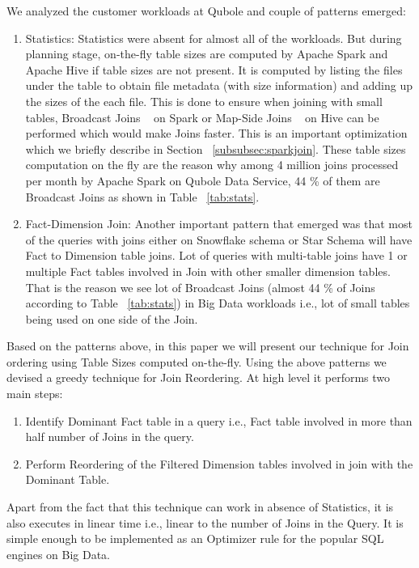 \documentclass[conference]{IEEEtran}
\begin{document}
We analyzed the customer workloads at Qubole and couple of patterns emerged:
\begin{enumerate}
\item Statistics: Statistics were absent for almost all of the workloads. But  during planning stage, on-the-fly table sizes are computed by Apache Spark and Apache Hive if table sizes are not present. It is computed by listing the files under the table to obtain file metadata (with size information) and adding up the sizes of the each file. This is done to ensure when joining with small tables, Broadcast Joins ~\cite{b13} on Spark or Map-Side Joins ~\cite{b10} on Hive can be performed which would make Joins faster. This is an important optimization which we briefly describe in Section ~\ref{subsubsec:sparkjoin}. These table sizes computation on the fly are the reason why among 4 million joins processed per month by Apache Spark on Qubole Data Service, 44 \% of them are Broadcast Joins as shown in Table ~\ref{tab:stats}.
\item Fact-Dimension Join: Another important pattern that emerged was that most of the queries with joins either on Snowflake schema or Star Schema will have Fact to Dimension table joins. Lot of queries with multi-table joins have 1 or multiple Fact tables involved in Join with other smaller dimension tables. That is the reason we see lot of Broadcast Joins (almost 44 \% of Joins according to Table ~\ref{tab:stats}) in Big Data workloads i.e., lot of small tables being used on one side of the Join.
\end{enumerate}

Based on the patterns above, in this paper we will present our technique for Join ordering using Table Sizes computed on-the-fly. Using the above patterns we devised a greedy technique for Join Reordering. At high level it performs two main steps:
\begin{enumerate}
\item Identify Dominant Fact table in a query i.e., Fact table involved in more than half number of Joins in the query. 
\item Perform Reordering of the Filtered Dimension tables involved in join with the Dominant Table.
\end{enumerate}

Apart from the fact that this technique can work in absence of Statistics, it is also executes in linear time i.e., linear to the number of Joins in the Query. It is simple enough to be implemented as an Optimizer rule for the popular SQL engines on Big Data.  
\end{document}
